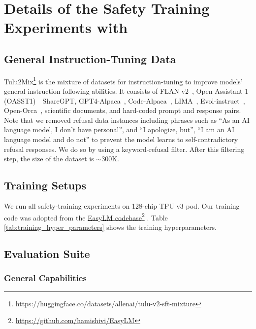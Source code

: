 \section{Details of the Safety Training Experiments with \dataset}
\label{asec:training-expts}

\subsection{General Instruction-Tuning Data}
\label{assec:tulu2mix}

Tulu2Mix\footnote{https://huggingface.co/datasets/allenai/tulu-v2-sft-mixture} is the mixture of datasets for instruction-tuning to improve models' general instruction-following abilities. It consists of FLAN v2~\citep{weifinetuned}, Open Assistant 1 (OASST1)~\, ShareGPT, GPT4-Alpaca~\citep{peng2023instruction}, Code-Alpaca~\citep{codealpaca}, LIMA~\citep{zhou2024lima}, Evol-instruct~\citep{xu2023wizardlm}, Open-Orca~\citep{OpenOrca}, scientific documents, and hard-coded prompt and response pairs. Note that we removed refusal data instances including phrases such as ``As an AI language model, I don't have personal'', and ``I apologize, but'', ``I am an AI language model and do not'' to prevent the model learns to self-contradictory refusal responses. We do so by using a keyword-refusal filter. After this filtering step, the size of the dataset is $\sim$300K.


\subsection{Training Setups}
\label{assec:full_safety_train_results}

We run all safety-training experiments on 128-chip TPU v3 pod. Our training code was adopted from the \hyperlink{https://github.com/hamishivi/EasyLM}{EasyLM codebase}\footnote{\url{https://github.com/hamishivi/EasyLM}} \citep{geng2023easylm}. Table \ref{tab:training_hyper_parameters} shows the training hyperparameters.


\subsection{Evaluation Suite}
\label{assec:safety_training_evals}

\subsubsection{General Capabilities}

